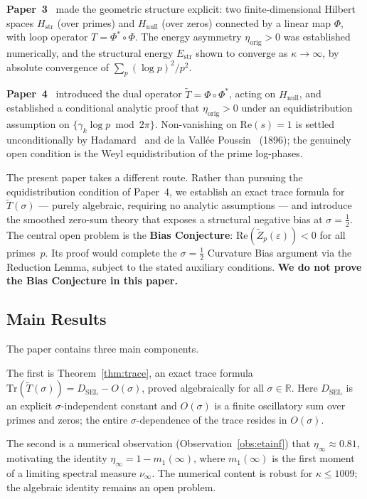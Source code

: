 \documentclass[11pt]{article}
\newcommand{\Hstr}{H_{\mathrm{str}}}
\newcommand{\Hnull}{H_{\mathrm{null}}}
\newcommand{\Estr}{E_{\mathrm{str}}}
\newcommand{\etaorig}{\eta_{\mathrm{orig}}}
\newcommand{\Tt}{\widetilde{T}}
\newcommand{\Zt}{\widetilde{Z}}
\newcommand{\DSEL}{D_{\mathrm{SEL}}}
\begin{document}
\textbf{Paper~3}~\cite{Paper3} made the geometric structure explicit:
two finite-dimensional Hilbert spaces $\Hstr$ (over primes) and
$\Hnull$ (over zeros) connected by a linear map $\Phi$, with loop
operator $T=\Phi^*\circ\Phi$.
The energy asymmetry $\etaorig>0$ was established numerically, and
the structural energy $\Estr$ shown to converge as $\kappa\to\infty$,
by absolute convergence of $\sum_p(\log p)^2/p^2$.

\textbf{Paper~4}~\cite{Paper4} introduced the dual operator
$\Tt=\Phi\circ\Phi^*$, acting on $\Hnull$, and established a
conditional analytic proof that $\etaorig>0$ under an equidistribution
assumption on $\{\gamma_k\log p\bmod 2\pi\}$.
Non-vanishing on $\mathrm{Re}(s)=1$ is settled unconditionally by
Hadamard~\cite{Hadamard} and de la Vall\'ee Poussin~\cite{dlVP}
(1896); the genuinely open
condition is the Weyl equidistribution of the prime log-phases.

The present paper takes a different route.
Rather than pursuing the equidistribution condition of Paper~4,
we establish an exact trace formula for $\Tt(\sigma)$ --- purely
algebraic, requiring no analytic assumptions --- and introduce
the smoothed zero-sum theory that exposes a structural negative
bias at $\sigma=\tfrac{1}{2}$.
The central open problem is the \textbf{Bias Conjecture}:
$\mathrm{Re}(\Zt_p(\varepsilon))<0$ for all primes~$p$.
Its proof would complete the $\sigma=\tfrac{1}{2}$ Curvature Bias
argument via the Reduction Lemma, subject to the stated auxiliary
conditions.
\textbf{We do not prove the Bias Conjecture in this paper.}

\subsection{Main Results}

The paper contains three main components.

The first is Theorem~\ref{thm:trace}, an exact trace formula
$\mathrm{Tr}(\Tt(\sigma)) = \DSEL - O(\sigma)$,
proved algebraically for all $\sigma\in\mathbb{R}$.
Here $\DSEL$ is an explicit $\sigma$-independent constant and
$O(\sigma)$ is a finite oscillatory sum over primes and zeros;
the entire $\sigma$-dependence of the trace resides in $O(\sigma)$.

The second is a numerical observation (Observation~\ref{obs:etainf})
that $\eta_\infty\approx 0.81$, motivating the identity
$\eta_\infty = 1-m_1(\infty)$, where $m_1(\infty)$ is the first
moment of a limiting spectral measure $\nu_\infty$.
The numerical content is robust for $\kappa\leq 1009$;
the algebraic identity remains an open problem.
\end{document}
